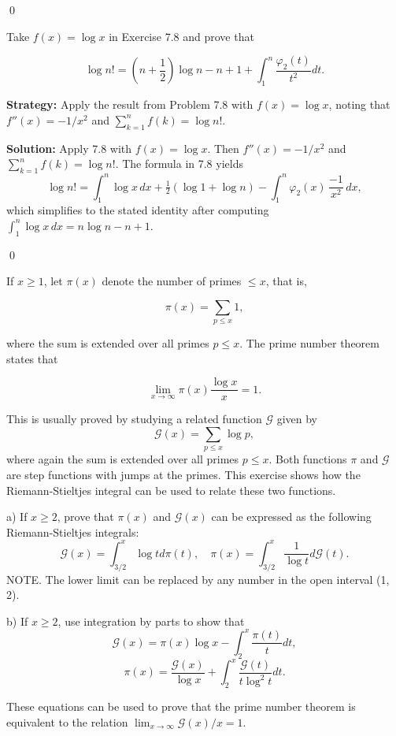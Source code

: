 \qed
\begin{problembox}
\begin{problemstatement}
Take $f(x) = \log x$ in Exercise 7.8 and prove that

\[ \log n! = (n + \frac{1}{2}) \log n - n + 1 + \int_1^n \frac{\varphi_2(t)}{t^2} dt. \]
\end{problemstatement}
\end{problembox}

\noindent\textbf{Strategy:} Apply the result from Problem 7.8 with $f(x) = \log x$, noting that $f''(x) = -1/x^2$ and $\sum_{k=1}^n f(k) = \log n!$.

\bigskip\noindent\textbf{Solution:}
Apply 7.8 with $f(x)=\log x$. Then $f''(x)=-1/x^2$ and $\sum_{k=1}^n f(k)=\log n!$. The formula in 7.8 yields
\[\log n!= \int_1^n \log x\,dx + \tfrac12(\log 1+\log n) - \int_1^n \varphi_2(x)\,\frac{-1}{x^2}\,dx,
\]
which simplifies to the stated identity after computing $\int_1^n \log x\,dx = n\log n - n + 1$.




\qed
\begin{problembox}
\begin{problemstatement}
If $x \geq 1$, let $\pi(x)$ denote the number of primes $\leq x$, that is,

\[ \pi(x) = \sum_{p \leq x} 1, \]

where the sum is extended over all primes $p \leq x$. The prime number theorem states that

\[ \lim_{x \to \infty} \pi(x) \frac{\log x}{x} = 1. \]

This is usually proved by studying a related function $\mathcal{G}$ given by
\[\mathcal{G}(x) = \sum_{p \leq x} \log p,\]
where again the sum is extended over all primes $p \leq x$. Both functions $\pi$ and $\mathcal{G}$ are step functions with jumps at the primes. This exercise shows how the Riemann-Stieltjes integral can be used to relate these two functions.

a) If $x \geq 2$, prove that $\pi(x)$ and $\mathcal{G}(x)$ can be expressed as the following Riemann-Stieltjes integrals:
\[\mathcal{G}(x) = \int_{3/2}^{x} \log t d\pi(t), \quad \pi(x) = \int_{3/2}^{x} \frac{1}{\log t} d\mathcal{G}(t).\]
NOTE. The lower limit can be replaced by any number in the open interval (1, 2).

b) If $x \geq 2$, use integration by parts to show that
\[\mathcal{G}(x) = \pi(x) \log x - \int_{2}^{x} \frac{\pi(t)}{t} dt,\]
\[\pi(x) = \frac{\mathcal{G}(x)}{\log x} + \int_{2}^{x} \frac{\mathcal{G}(t)}{t \log^{2} t} dt.\]

These equations can be used to prove that the prime number theorem is equivalent to the relation $\lim_{x \to \infty} \mathcal{G}(x)/x = 1$.
\end{problemstatement}
\end{problembox}

